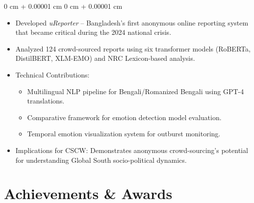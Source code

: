 \documentclass[10pt, letterpaper]{article}
\newenvironment{highlights}{
    \begin{itemize}[
        topsep=0.10 cm,
        parsep=0.10 cm,
        partopsep=0pt,
        itemsep=0pt,
        leftmargin=0 cm + 10pt
    ]
}{
    \end{itemize}
} %
\newenvironment{onecolentry}{
    \begin{adjustwidth}{
        0 cm + 0.00001 cm
    }{
        0 cm + 0.00001 cm
    }
}{
    \end{adjustwidth}
} %
\begin{document}
\begin{onecolentry}
    \begin{highlights}
        \item Developed \textit{uReporter} -- Bangladesh's first anonymous online reporting system that became critical during the 2024 national crisis.
        \item Analyzed 124 crowd-sourced reports using six transformer models (RoBERTa, DistilBERT, XLM-EMO) and NRC Lexicon-based analysis.
        
        \item Technical Contributions:
            \begin{itemize}
                \item Multilingual NLP pipeline for Bengali/Romanized Bengali using GPT-4 translations.
                \item Comparative framework for emotion detection model evaluation.
                \item Temporal emotion visualization system for outburst monitoring.
            \end{itemize}
        \item Implications for CSCW: Demonstrates anonymous crowd-sourcing's potential for understanding Global South socio-political dynamics.
    \end{highlights}
\end{onecolentry}

    \section{Achievements \& Awards}
\end{document}
